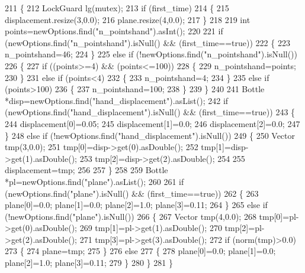 \begin{DoxyCode}
211 \{
212     LockGuard lg(mutex);
213     \textcolor{keywordflow}{if} (first\_time)
214     \{
215         displacement.resize(3,0.0);
216         plane.resize(4,0.0);
217     \}
218 
219     \textcolor{keywordtype}{int} points=newOptions.find(\textcolor{stringliteral}{"n\_pointshand"}).asInt();
220 
221     \textcolor{keywordflow}{if} (newOptions.find(\textcolor{stringliteral}{"n\_pointshand"}).isNull() && (first\_time==\textcolor{keyword}{true}))
222     \{
223         n_pointshand=46;
224     \}
225     \textcolor{keywordflow}{else} \textcolor{keywordflow}{if} (!newOptions.find(\textcolor{stringliteral}{"n\_pointshand"}).isNull())
226     \{
227         \textcolor{keywordflow}{if} ((points>=4) && (points<=100))
228         \{
229             n_pointshand=points;
230         \}
231         \textcolor{keywordflow}{else} \textcolor{keywordflow}{if} (points<4)
232         \{
233             n_pointshand=4;
234         \}
235         \textcolor{keywordflow}{else} \textcolor{keywordflow}{if} (points>100)
236         \{
237             n_pointshand=100;
238         \}
239     \}
240 
241     Bottle *disp=newOptions.find(\textcolor{stringliteral}{"hand\_displacement"}).asList();
242     \textcolor{keywordflow}{if} (newOptions.find(\textcolor{stringliteral}{"hand\_displacement"}).isNull() && (first\_time==\textcolor{keyword}{true}))
243     \{
244         displacement[0]=0.05;
245         displacement[1]=0.0;
246         displacement[2]=0.0;
247     \}
248     \textcolor{keywordflow}{else} \textcolor{keywordflow}{if} (!newOptions.find(\textcolor{stringliteral}{"hand\_displacement"}).isNull())
249     \{
250         Vector tmp(3,0.0);
251         tmp[0]=disp->get(0).asDouble();
252         tmp[1]=disp->get(1).asDouble();
253         tmp[2]=disp->get(2).asDouble();
254 
255         displacement=tmp;
256 
257     \}
258 
259     Bottle *pl=newOptions.find(\textcolor{stringliteral}{"plane"}).asList();
260 
261     \textcolor{keywordflow}{if} (newOptions.find(\textcolor{stringliteral}{"plane"}).isNull() && (first\_time==\textcolor{keyword}{true}))
262     \{
263         plane[0]=0.0; plane[1]=0.0; plane[2]=1.0; plane[3]=0.11;
264     \}
265     \textcolor{keywordflow}{else} \textcolor{keywordflow}{if} (!newOptions.find(\textcolor{stringliteral}{"plane"}).isNull())
266     \{
267         Vector tmp(4,0.0);
268         tmp[0]=pl->get(0).asDouble();
269         tmp[1]=pl->get(1).asDouble();
270         tmp[2]=pl->get(2).asDouble();
271         tmp[3]=pl->get(3).asDouble();
272         \textcolor{keywordflow}{if} (norm(tmp)>0.0)
273         \{
274             plane=tmp;
275         \}
276         \textcolor{keywordflow}{else}
277         \{
278             plane[0]=0.0; plane[1]=0.0; plane[2]=1.0; plane[3]=0.11;
279         \}
280     \}
281 \}
\end{DoxyCode}
